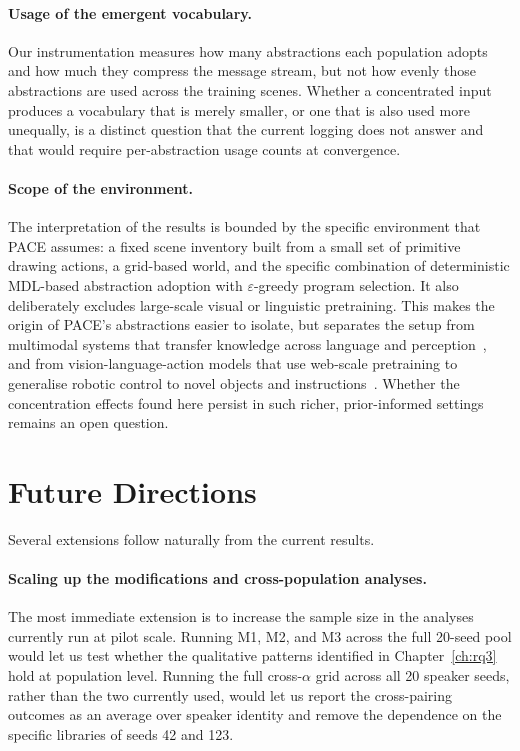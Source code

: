 \paragraph{Usage of the emergent vocabulary.}
Our instrumentation measures how many abstractions each population adopts and how much they compress the message stream, but not how evenly those abstractions are used across the training scenes. Whether a concentrated input produces a vocabulary that is merely smaller, or one that is also used more unequally, is a distinct question that the current logging does not answer and that would require per-abstraction usage counts at convergence.

\paragraph{Scope of the environment.}
The interpretation of the results is bounded by the specific environment that PACE assumes: a fixed scene inventory built from a small set of primitive drawing actions, a grid-based world, and the specific combination of deterministic MDL-based abstraction adoption with $\varepsilon$-greedy program selection. It also deliberately excludes large-scale visual or linguistic pretraining. This makes the origin of PACE's abstractions easier to isolate, but separates the setup from multimodal systems that transfer knowledge across language and perception~\cite{huang_language_2023}, and from vision-language-action models that use web-scale pretraining to generalise robotic control to novel objects and instructions~\cite{brohan_rt-2_2023}. Whether the concentration effects found here persist in such richer, prior-informed settings remains an open question.

\section{Future Directions}
\label{sec:future-directions}

Several extensions follow naturally from the current results.

\paragraph{Scaling up the modifications and cross-population analyses.}
The most immediate extension is to increase the sample size in the analyses currently run at pilot scale. Running M1, M2, and M3 across the full 20-seed pool would let us test whether the qualitative patterns identified in Chapter~\ref{ch:rq3} hold at population level. Running the full cross-$\alpha$ grid across all 20 speaker seeds, rather than the two currently used, would let us report the cross-pairing outcomes as an average over speaker identity and remove the dependence on the specific libraries of seeds 42 and 123.

